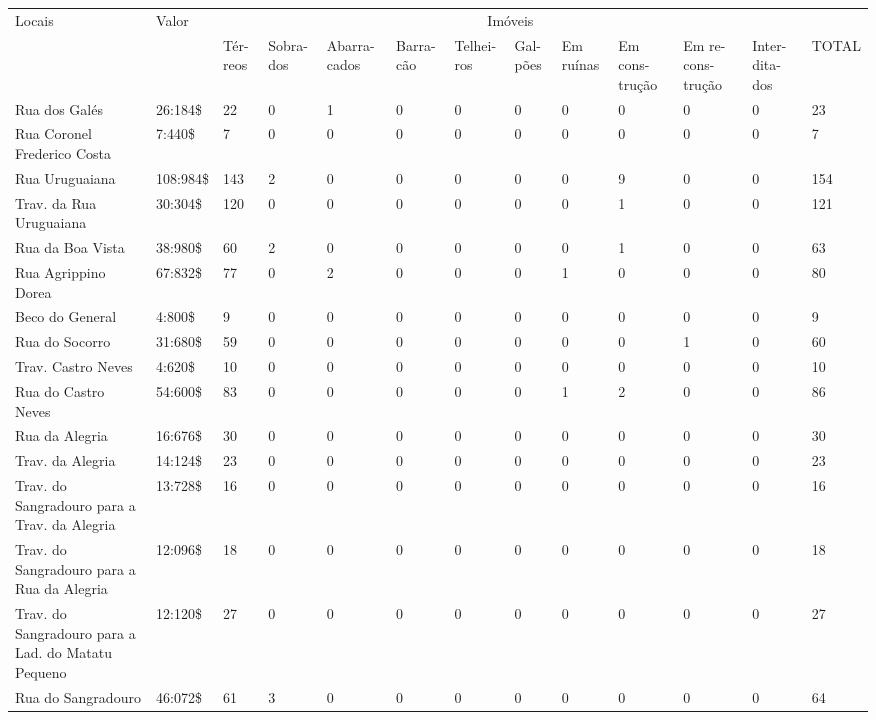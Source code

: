\begin{lansdcape}
\begin{table}[!htp]
{
\begin{tiny}
\begin{tabular}{m{3cm} m{1cm} m{} m{} m{} m{} m{} m{} m{} m{} m{} m{} m{}}
\hline
\multirow{2}{*}{Locais}	& \multirow{2}{*}{Valor}	& \multicolumn{10}{c}{Imóveis}\\
\cline{3-13}
	&	&Tér- reos	&Sobra- dos	&Abarra- cados	&Barra- cão	&Telhei- ros	&Gal- pões	&Em ruínas	&Em cons- trução	&Em re- cons- trução	&Inter- dita- dos	&TOTAL\\
\hline
\hline
Rua dos Galés							&26:184\$	&22	&0	&1	&0	&0	&0	&0	&0	&0	&0	&23\\
Rua Coronel Frederico Costa					&7:440\$	&7	&0	&0	&0	&0	&0	&0	&0	&0	&0	&7\\
Rua Uruguaiana							&108:984\$	&143	&2	&0	&0	&0	&0	&0	&9	&0	&0	&154\\
Trav. da Rua Uruguaiana					&30:304\$	&120	&0	&0	&0	&0	&0	&0	&1	&0	&0	&121\\
Rua da Boa Vista						&38:980\$	&60	&2	&0	&0	&0	&0	&0	&1	&0	&0	&63\\
Rua Agrippino Dorea						&67:832\$	&77	&0	&2	&0	&0	&0	&1	&0	&0	&0	&80\\
Beco do General							&4:800\$	&9	&0	&0	&0	&0	&0	&0	&0	&0	&0	&9\\
Rua do Socorro							&31:680\$	&59	&0	&0	&0	&0	&0	&0	&0	&1	&0	&60\\
Trav. Castro Neves					&4:620\$	&10	&0	&0	&0	&0	&0	&0	&0	&0	&0	&10\\
Rua do Castro Neves						&54:600\$	&83	&0	&0	&0	&0	&0	&1	&2	&0	&0	&86\\
Rua da Alegria							&16:676\$	&30	&0	&0	&0	&0	&0	&0	&0	&0	&0	&30\\
Trav. da Alegria						&14:124\$	&23	&0	&0	&0	&0	&0	&0	&0	&0	&0	&23\\
Trav. do Sangradouro para a Trav. da Alegria		&13:728\$	&16	&0	&0	&0	&0	&0	&0	&0	&0	&0	&16\\
Trav. do Sangradouro para a Rua da Alegria			&12:096\$	&18	&0	&0	&0	&0	&0	&0	&0	&0	&0	&18\\
Trav. do Sangradouro para a Lad. do Matatu Pequeno	&12:120\$	&27	&0	&0	&0	&0	&0	&0	&0	&0	&0	&27\\
Rua do Sangradouro						&46:072\$	&61	&3	&0	&0	&0	&0	&0	&0	&0	&0	&64\\

\end{tabular}
\end{tiny}}
\end{table}
\end{lansdcape}
